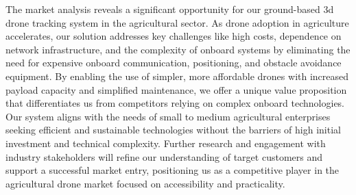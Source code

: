The market analysis reveals a significant opportunity for our ground-based \acrshort{3d} drone tracking system in the agricultural sector. As drone adoption in agriculture accelerates, our solution addresses key challenges like high costs, dependence on network infrastructure, and the complexity of onboard systems by eliminating the need for expensive onboard communication, positioning, and obstacle avoidance equipment. By enabling the use of simpler, more affordable drones with increased payload capacity and simplified maintenance, we offer a unique value proposition that differentiates us from competitors relying on complex onboard technologies. Our system aligns with the needs of small to medium agricultural enterprises seeking efficient and sustainable technologies without the barriers of high initial investment and technical complexity. Further research and engagement with industry stakeholders will refine our understanding of target customers and support a successful market entry, positioning us as a competitive player in the agricultural drone market focused on accessibility and practicality.